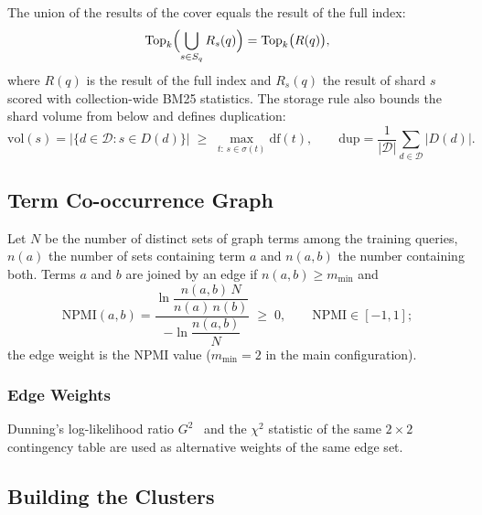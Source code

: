 \documentclass[11pt, a4paper]{article}
\newif\ifdraftnotes
\newcommand{\todo}[1]{\ifdraftnotes\par\noindent{\small\color{red!75!black}\textbf{TODO:} #1}\par\fi}
\begin{document}
The union of the results of the cover equals the result of the full index:
\begin{equation}
	\mathrm{Top}_k\Bigl(\bigcup_{s\in S_q} R_s(q)\Bigr)=\mathrm{Top}_k\bigl(R(q)\bigr),
	\label{eq:invariant}
\end{equation}
where $R(q)$ is the result of the full index and $R_s(q)$ the result of shard $s$ scored with collection-wide BM25 statistics.
The storage rule also bounds the shard volume from below and defines duplication:
\begin{equation}
	\mathrm{vol}(s)=\bigl|\{d\in\mathcal{D}: s\in D(d)\}\bigr| \;\ge\; \max_{t:\,s\in\sigma(t)}\mathrm{df}(t),
	\qquad
	\mathrm{dup}=\frac{1}{|\mathcal{D}|}\sum_{d\in\mathcal{D}}|D(d)|.
	\label{eq:lower-bound}
\end{equation}

\subsection{Term Co-occurrence Graph}

\todo{Text: vertices (training-query terms, document-frequency thresholds, stop words and \nFrameWords{} question-frame words), edges and weights (Eq.~\eqref{eq:npmi}), the resulting graph size (Table~\ref{tab:corpus}). Materials: none.}

Let $N$ be the number of distinct sets of graph terms among the training queries, $n(a)$ the number of sets containing term $a$ and $n(a,b)$ the number containing both.
Terms $a$ and $b$ are joined by an edge if $n(a,b)\ge m_{\min}$ and
\begin{equation}
	\mathrm{NPMI}(a,b)=\frac{\ln\dfrac{n(a,b)\,N}{n(a)\,n(b)}}{-\ln\dfrac{n(a,b)}{N}}\;\ge\;0,
	\qquad \mathrm{NPMI}\in[-1,1];
	\label{eq:npmi}
\end{equation}
the edge weight is the NPMI value ($m_{\min}=2$ in the main configuration).

\subsubsection{Edge Weights}
Dunning's log-likelihood ratio $G^2$~\cite{dunning1993} and the $\chi^2$ statistic of the same $2\times2$ contingency table are used as alternative weights of the same edge set.

\subsection{Building the Clusters}
\end{document}
